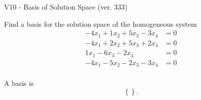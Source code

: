 \begin{exercise}
  \begin{exerciseTitle}V10 - Basis of Solution Space (ver. 333)\end{exerciseTitle}
  \begin{exerciseStatement}
    Find a basis for the solution space of the homogeneous system 
\begin{align*}
 -4 x_ 1 + 1 x_ 2 + 5 x_ 3 -3 x_ 4 &= 0  \\ 
  -4 x_ 1 + 2 x_ 2 + 5 x_ 3 + 2 x_ 4 &= 0  \\ 
  1 x_ 1 -6 x_ 3 -2 x_ 4 &= 0  \\ 
  -4 x_ 1 -5 x_ 2 -2 x_ 3 -3 x_ 4 &= 0  \\ 
 \end{align*}


 
  \end{exerciseStatement}

  \begin{exerciseAnswer}
   A basis is   
\[\left\{\right\}.\]

  


  \end{exerciseAnswer}
\end{exercise}